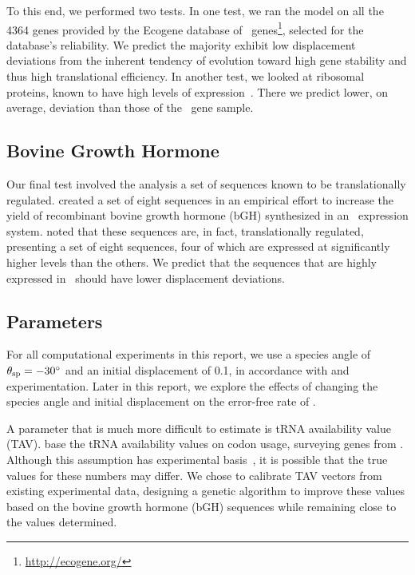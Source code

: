 \documentclass[12pt]{article}
\begin{document}
To this end, we performed two tests. In one test, we ran the model on
all the 4364 genes provided by the Ecogene database of
\ecoli\ genes\footnote{\url{http://ecogene.org/}}, selected for the
database's reliability. We predict the majority exhibit low
displacement deviations from the inherent tendency of evolution toward
high gene stability and thus high translational efficiency. In another
test, we looked at ribosomal proteins, known to have high levels of
expression~\cite{rpoS:process}. There we predict lower, on average,
deviation than those of the \ecoli\ gene sample.
	
\subsection{Bovine Growth Hormone}
Our final test involved the analysis a set of sequences known to 
be translationally regulated.  \citet{schoner:bgh} created a set 
of eight sequences in an empirical effort to increase the yield 
of recombinant bovine growth hormone (bGH) synthesized in an 
\ecoli\ expression system. \citeauthor{schoner:bgh} noted that 
these sequences are, in fact, translationally regulated, 
presenting a set of eight sequences, four of which are expressed 
at significantly higher levels than the others. We predict that 
the sequences that are highly expressed in \ecoli\ should have 
lower displacement deviations.

\subsection{Parameters}
\label{section:parameters}
For all computational experiments in this report, we use a species
angle of $\theta_{\rm{sp}} = -30^\circ$ and an initial displacement of 0.1,
in accordance with \citet{lalit:mechanics} and experimentation.
Later in this report, we explore
the effects of changing the species angle and initial displacement on the
error-free rate of \prfB.

A parameter that is much more difficult to estimate
is tRNA availability value (TAV).
\citeauthor{lalit:mechanics} base the tRNA availability values on codon usage, 
surveying genes from \ecoli.
Although this assumption has experimental basis~\cite{ikemura}, 
it is possible that the true values for these numbers may differ.
We chose to calibrate TAV vectors from existing experimental data, 
designing a genetic algorithm to improve these values based on 
the bovine growth hormone (bGH) sequences while remaining close 
to the values \citeauthor{lalit:mechanics} determined.
\end{document}
